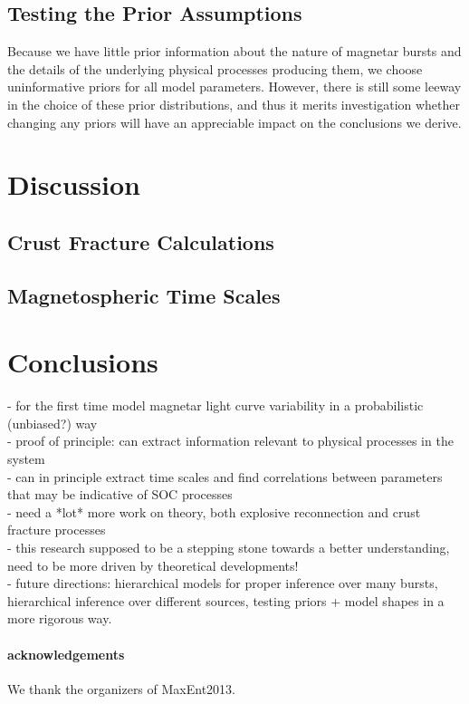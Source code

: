 \documentclass[12pt]{emulateapj}
\begin{document}
\subsection{Testing the Prior Assumptions}

Because we have little prior information about the nature of magnetar bursts and the details of
the underlying physical processes producing them, we choose uninformative priors for all model parameters. However,
there is still some leeway in the choice of these prior distributions, and thus it merits investigation whether changing
any priors will have an appreciable impact on the conclusions we derive. 




\section{Discussion}

\subsection{Crust Fracture Calculations}


\subsection{Magnetospheric Time Scales}


\section{Conclusions}

- for the first time model magnetar light curve variability in a probabilistic (unbiased?) way \\
- proof of principle: can extract information relevant to physical processes in the system \\
- can in principle extract time scales and find correlations between parameters that may be
indicative of SOC processes \\
- need a *lot* more work on theory, both explosive reconnection and crust fracture processes \\
- this research supposed to be a stepping stone towards a better understanding, need to be
more driven by theoretical developments! \\
- future directions: hierarchical models for proper inference over many bursts, hierarchical inference
over different sources, testing priors + model shapes in a more rigorous way.


\paragraph{acknowledgements}
We thank the organizers of MaxEnt2013.




\end{document}
